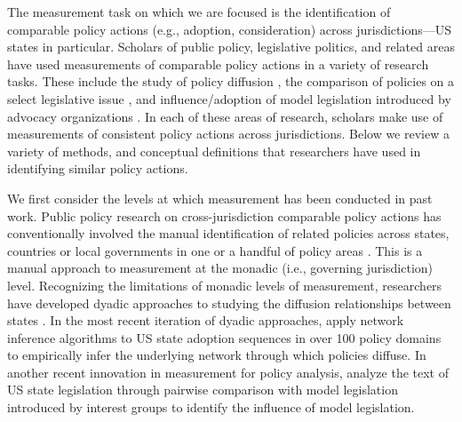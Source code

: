 \documentclass[12pt]{article} %
\begin{document}
The measurement task on which we are focused is the identification of comparable policy actions (e.g., adoption, consideration) across jurisdictions---US states in particular. Scholars of public policy, legislative politics, and related areas have used measurements of comparable policy actions in a variety of research tasks. These include the study of policy diffusion \citep{karch2007emerging}, the comparison of policies on a select legislative issue \citep[e.g., ][]{huber2001legislatures,mycoff2009empirical}, and influence/adoption of model legislation introduced by advocacy organizations \citep[e.g., ][]{garrett2015,burgess2016legislative}. In each of these areas of research, scholars make use of measurements of consistent policy actions across jurisdictions. Below we review a variety of methods, and conceptual definitions that researchers have used in identifying similar policy actions.

We first consider the levels at which measurement has been conducted in past work. Public policy research on cross-jurisdiction comparable policy actions has conventionally involved the manual identification of related policies across states, countries or local governments in one or a handful of policy areas \citep[e.g., ][]{walker1969,berry1990,simmons2004,gilardi2009,krause2011policy}. This is a manual approach to measurement at the monadic (i.e., governing jurisdiction) level. Recognizing the limitations of monadic levels of measurement, researchers have developed dyadic approaches to studying the diffusion relationships between states \citep{volden2006,boehmke2009}. In the most recent iteration of dyadic approaches, \cite{desmarais2015} apply network inference algorithms to US state adoption sequences in over 100 policy domains to empirically infer the underlying network through which policies diffuse. In another recent innovation in measurement for policy analysis, \cite{garrett2015} analyze the text of US state legislation through pairwise comparison with model legislation introduced by interest groups to identify the influence of model legislation.
 
\end{document}
